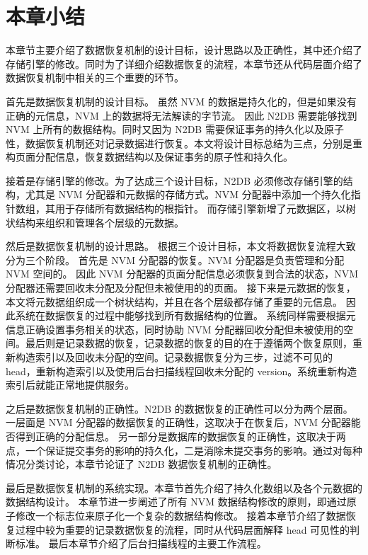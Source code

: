 \section{本章小结}

本章节主要介绍了数据恢复机制的设计目标，设计思路以及正确性，其中还介绍了存储引擎的修改。同时为了详细介绍数据恢复的流程，本章节还从代码层面介绍了数据恢复机制中相关的三个重要的环节。

首先是数据恢复机制的设计目标。
虽然 NVM 的数据是持久化的，但是如果没有正确的元信息，NVM 上的数据将无法解读的字节流。
因此 N2DB 需要能够找到 NVM 上所有的数据结构。同时又因为 N2DB 需要保证事务的持久化以及原子性，数据恢复机制还对记录数据进行恢复。本文将设计目标总结为三点，分别是重构页面分配信息，恢复数据结构以及保证事务的原子性和持久化。

接着是存储引擎的修改。为了达成三个设计目标，N2DB 必须修改存储引擎的结构，尤其是 NVM 分配器和元数据的存储方式。NVM 分配器中添加一个持久化指针数组，其用于存储所有数据结构的根指针。
而存储引擎新增了元数据区，以树状结构来组织和管理各个层级的元数据。

然后是数据恢复机制的设计思路。
根据三个设计目标，本文将数据恢复流程大致分为三个阶段。
首先是 NVM 分配器的恢复。NVM 分配器是负责管理和分配 NVM 空间的。
因此 NVM 分配器的页面分配信息必须恢复到合法的状态，NVM 分配器还需要回收未分配及分配但未被使用的的页面。
接下来是元数据的恢复，本文将元数据组织成一个树状结构，并且在各个层级都存储了重要的元信息。
因此系统在数据恢复的过程中能够找到所有数据结构的位置。
系统同样需要根据元信息正确设置事务相关的状态，同时协助 NVM 分配器回收分配但未被使用的空间。最后则是记录数据的恢复，记录数据的恢复的目的在于遵循两个恢复原则，重新构造索引以及回收未分配的空间。记录数据恢复分为三步，过滤不可见的 head，重新构造索引以及使用后台扫描线程回收未分配的 version。系统重新构造索引后就能正常地提供服务。

之后是数据恢复机制的正确性。N2DB 的数据恢复的正确性可以分为两个层面。一层面是 NVM 分配器的数据恢复的正确性，这取决于在恢复后，NVM 分配器能否得到正确的分配信息。
另一部分是数据库的数据恢复的正确性，这取决于两点，一个保证提交事务的影响的持久化，二是消除未提交事务的影响。通过对每种情况分类讨论，本章节论证了 N2DB 数据恢复机制的正确性。

最后是数据恢复机制的系统实现。本章节首先介绍了持久化数组以及各个元数据的数据结构设计。
本章节进一步阐述了所有 NVM 数据结构修改的原则，即通过原子修改一个标志位来原子化一个复杂的数据结构修改。
接着本章节介绍了数据恢复过程中较为重要的记录数据恢复的流程，同时从代码层面解释 head 可见性的判断标准。
最后本章节介绍了后台扫描线程的主要工作流程。


